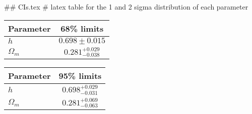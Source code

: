 ## CIs.tex
# latex table for the 1 and 2 sigma distribution of each parameter

\begin{tabular} { l  c}
 Parameter &  68\% limits\\
\hline
{\boldmath$h              $} & $0.698\pm 0.015            $\\
{\boldmath$\Omega_m       $} & $0.281^{+0.029}_{-0.038}   $\\
\hline
\end{tabular}

\begin{tabular} { l  c}
 Parameter &  95\% limits\\
\hline
{\boldmath$h              $} & $0.698^{+0.029}_{-0.031}   $\\
{\boldmath$\Omega_m       $} & $0.281^{+0.069}_{-0.063}   $\\
\hline
\end{tabular}
